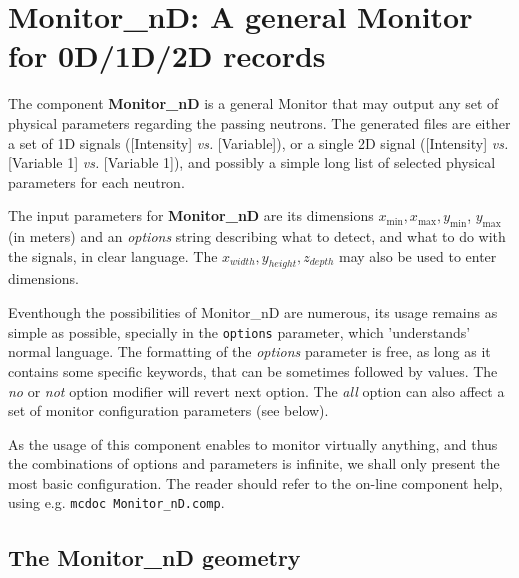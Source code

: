 \section{Monitor\_nD: A general Monitor for 0D/1D/2D records}
\label{s:monitornd}


The component \textbf{Monitor\_nD} is a general Monitor that may output any
set of physical parameters regarding the passing neutrons. The
generated files are either a set of 1D signals ([Intensity] \textit{vs.}
[Variable]), or a single 2D signal ([Intensity] \textit{vs.} [Variable 1]
\textit{vs.} [Variable 1]), and possibly a simple long list of selected
physical parameters for each neutron.

The input parameters for \textbf{Monitor\_nD} are its dimensions $x_\mathrm{
  min}, x_\mathrm{max}, y_\mathrm{min}$, $y_\mathrm{max}$ (in meters) and an \textit{
  options} string describing what to detect, and what to do with the
signals, in clear language. The $x_{width}, y_{height}, z_{depth}$ may also be used to enter dimensions.

Eventhough the possibilities of Monitor\_nD are numerous, its usage remains as simple as possible, specially in the \verb+options+ parameter, which 'understands' normal language.
The formatting of the \textit{options}
parameter is free, as long as it contains some specific keywords, that
can be sometimes followed by values. The \textit{no} or \textit{not} option
modifier will revert next option. The \textit{all} option can also affect a
set of monitor configuration parameters (see below).

As the usage of this component enables to monitor virtually anything, and thus the combinations of options and parameters is infinite, we shall only present the most basic configuration. The reader should refer to the on-line component help, using e.g. \verb+mcdoc Monitor_nD.comp+.

\subsection{The Monitor\_nD geometry}

